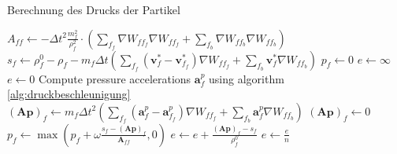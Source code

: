 \documentclass{scrreprt}
\begin{document}
\begin{algorithm}
\caption{Berechnung des Drucks der Partikel}
\label{alg:druck}
\begin{algorithmic}[1]
        \STATE $A_{ff} \gets -\Delta t^2 \frac{m_f^2}{\rho_f^2} \cdot \left(\sum_{f_f}\nabla W_{ff_f} \nabla W_{ff_f} + \sum_{f_b}\nabla W_{ff_b} \nabla W_{ff_b}\right)$
        \STATE $s_f \gets \rho_f^0 - \rho_f - m_f \Delta t \left(\sum_{f_f}(\textbf{v}_f^* - \textbf{v}_{f_f}^*) \nabla W_{ff_f} + \sum_{f_b}\textbf{v}_f^* \nabla W_{ff_b}\right)$
        \STATE $p_f \gets 0$
    \ENDFOR
     \STATE $e \gets \infty$
        \STATE $e \gets 0$
        \STATE Compute pressure accelerations $\textbf{a}_f^p$ using algorithm \ref{alg:druckbeschleunigung}
            \STATE $(\textbf{A}\textbf{p})_f \gets m_f \Delta t^2\left(\sum_{f_f}(\textbf{a}_f^p - \textbf{a}_{f_f}^p) \nabla W_{ff_f} + \sum_{f_b}\textbf{a}_f^p \nabla W_{ff_b}\right)$
                \STATE $(\textbf{A}\textbf{p})_f \gets 0$
            \ENDIF
            \STATE $p_f \gets \max(p_f + \omega \frac{s_f - (\textbf{A}\textbf{p})_f}{\textbf{A}_{ff}}, 0)$
            \STATE $e \gets e + \frac{(\textbf{A}\textbf{p})_f - s_f}{\rho_f^0}$
        \ENDFOR
        \STATE $e \gets \frac{e}{n}$
    \ENDWHILE
\end{algorithmic}
\end{algorithm}
\end{document}
